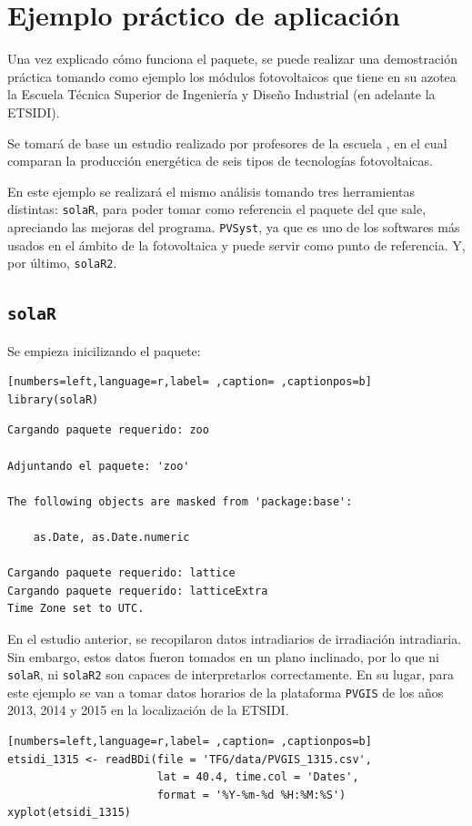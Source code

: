 \chapter{Ejemplo práctico de aplicación}
\label{chap:ejemplo-practico-aplicacion}
Una vez explicado cómo funciona el paquete, se puede realizar una demostración práctica tomando como ejemplo los módulos fotovoltaicos que tiene en su azotea la Escuela Técnica Superior de Ingeniería y Diseño Industrial (en adelante la ETSIDI).

Se tomará de base un estudio realizado por profesores de la escuela \cite{adrada17}, en el cual comparan la producción energética de seis tipos de tecnologías fotovoltaicas.

En este ejemplo se realizará el mismo análisis tomando tres herramientas distintas: \texttt{solaR}, para poder tomar como referencia el paquete del que sale, apreciando las mejoras del programa. \texttt{PVSyst}, ya que es uno de los softwares más usados en el ámbito de la fotovoltaica y puede servir como punto de referencia. Y, por último, \texttt{solaR2}.

\section{\texttt{solaR}}
\label{sec:orgb6ba0d4}
\label{sec:solaR}
Se empieza inicilizando el paquete:
\begin{lstlisting}[numbers=left,language=r,label= ,caption= ,captionpos=b]
library(solaR)
\end{lstlisting}

\begin{verbatim}
Cargando paquete requerido: zoo

Adjuntando el paquete: 'zoo'

The following objects are masked from 'package:base':

    as.Date, as.Date.numeric

Cargando paquete requerido: lattice
Cargando paquete requerido: latticeExtra
Time Zone set to UTC.
\end{verbatim}

En el estudio anterior, se recopilaron datos intradiarios de irradiación intradiaria. Sin embargo, estos datos fueron tomados en un plano inclinado, por lo que ni \texttt{solaR}, ni \texttt{solaR2} son capaces de interpretarlos correctamente. En su lugar, para este ejemplo se van a tomar datos horarios de la plataforma \texttt{PVGIS} \cite{pvgis} de los años 2013, 2014 y 2015 en la localización de la ETSIDI.
\begin{lstlisting}[numbers=left,language=r,label= ,caption= ,captionpos=b]
etsidi_1315 <- readBDi(file = 'TFG/data/PVGIS_1315.csv',
                       lat = 40.4, time.col = 'Dates',
                       format = '%Y-%m-%d %H:%M:%S')
xyplot(etsidi_1315)
\end{lstlisting}

